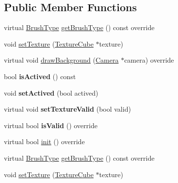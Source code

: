 \subsection*{Public Member Functions}
\begin{DoxyCompactItemize}
\item 
virtual \hyperlink{classCameraBackgroundBrush_acb83e8d05e7ab9386c041d22c444760f}{Brush\+Type} \hyperlink{classCameraBackgroundSkyBoxBrush_a2db3e09fced9ed84fb3e5df9f24bba8e}{get\+Brush\+Type} () const override
\item 
void \hyperlink{classCameraBackgroundSkyBoxBrush_a073d2638402d47d04040b2af55d55a23}{set\+Texture} (\hyperlink{classTextureCube}{Texture\+Cube} $\ast$texture)
\item 
virtual void \hyperlink{classCameraBackgroundSkyBoxBrush_aa01f6019518a0428872e8307962647fa}{draw\+Background} (\hyperlink{classCamera}{Camera} $\ast$camera) override
\item 
\mbox{\label{classCameraBackgroundSkyBoxBrush_a8182d27b033168e109f12ebaaed2adc2}} 
bool {\bfseries is\+Actived} () const
\item 
\mbox{\label{classCameraBackgroundSkyBoxBrush_a7031969f3cc1368c813f2488bbbc4784}} 
void {\bfseries set\+Actived} (bool actived)
\item 
\mbox{\label{classCameraBackgroundSkyBoxBrush_a12cd2c38305f59a427c0196d7c1098e6}} 
virtual void {\bfseries set\+Texture\+Valid} (bool valid)
\item 
\mbox{\label{classCameraBackgroundSkyBoxBrush_abd502065e078d1373a098880b06d86f8}} 
virtual bool {\bfseries is\+Valid} () override
\item 
virtual bool \hyperlink{classCameraBackgroundSkyBoxBrush_a267d8d2c4f44ac27c6f028b06fb31775}{init} () override
\item 
virtual \hyperlink{classCameraBackgroundBrush_acb83e8d05e7ab9386c041d22c444760f}{Brush\+Type} \hyperlink{classCameraBackgroundSkyBoxBrush_a2db3e09fced9ed84fb3e5df9f24bba8e}{get\+Brush\+Type} () const override
\item 
void \hyperlink{classCameraBackgroundSkyBoxBrush_a073d2638402d47d04040b2af55d55a23}{set\+Texture} (\hyperlink{classTextureCube}{Texture\+Cube} $\ast$texture)
\item 

\end{DoxyCompactItemize}
